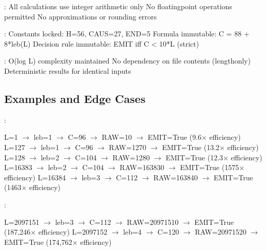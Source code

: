 \documentclass[letterpaper,10pt,english]{sphinxmanual}
\begin{document}
\sphinxAtStartPar
{}:
\sphinxhyphen{} All calculations use integer arithmetic only
\sphinxhyphen{} No floating\sphinxhyphen{}point operations permitted
\sphinxhyphen{} No approximations or rounding errors

\sphinxAtStartPar
{}:
\sphinxhyphen{} Constants locked: H=56, CAUS=27, END=5
\sphinxhyphen{} Formula immutable: C = 88 + 8*leb(L)
\sphinxhyphen{} Decision rule immutable: EMIT iff C \textless{} 10*L (strict)

\sphinxAtStartPar
{}:
\sphinxhyphen{} O(log L) complexity maintained
\sphinxhyphen{} No dependency on file contents (length\sphinxhyphen{}only)
\sphinxhyphen{} Deterministic results for identical inputs


\subsection{Examples and Edge Cases}
\label{\detokenize{mathematical_foundation:examples-and-edge-cases}}
\sphinxAtStartPar
{}:

\begin{sphinxVerbatim}[commandchars=\\\{\}]
L=1      \(\rightarrow\) leb=1 \(\rightarrow\) C=96   \(\rightarrow\) RAW=10    \(\rightarrow\) EMIT=True  (9.6× efficiency)
L=127    \(\rightarrow\) leb=1 \(\rightarrow\) C=96   \(\rightarrow\) RAW=1270  \(\rightarrow\) EMIT=True  (13.2× efficiency)
L=128    \(\rightarrow\) leb=2 \(\rightarrow\) C=104  \(\rightarrow\) RAW=1280  \(\rightarrow\) EMIT=True  (12.3× efficiency)
L=16383  \(\rightarrow\) leb=2 \(\rightarrow\) C=104  \(\rightarrow\) RAW=163830 \(\rightarrow\) EMIT=True  (1575× efficiency)
L=16384  \(\rightarrow\) leb=3 \(\rightarrow\) C=112  \(\rightarrow\) RAW=163840 \(\rightarrow\) EMIT=True  (1463× efficiency)
\end{sphinxVerbatim}

\sphinxAtStartPar
{}:

\begin{sphinxVerbatim}[commandchars=\\\{\}]
L=2097151 \(\rightarrow\) leb=3 \(\rightarrow\) C=112  \(\rightarrow\) RAW=20971510 \(\rightarrow\) EMIT=True  (187,246× efficiency)
L=2097152 \(\rightarrow\) leb=4 \(\rightarrow\) C=120  \(\rightarrow\) RAW=20971520 \(\rightarrow\) EMIT=True  (174,762× efficiency)
\end{sphinxVerbatim}
\end{document}
